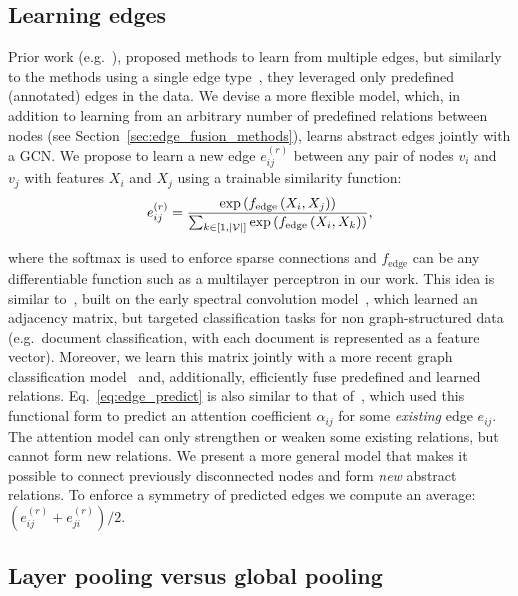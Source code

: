 \documentclass[final,nonatbib]{article} \usepackage{nips_2018}
\begin{document}
	\subsection{Learning edges}
	\label{sec:learn_edges}
	Prior work (e.g.~\cite{schlichtkrull2018modeling,bordes2013translating}),
	proposed methods to learn from multiple edges, but similarly to the methods using a single edge type~\cite{kipf2016semi}, they leveraged only predefined (annotated) edges in the data.
	We devise a more flexible model, which, in addition to learning from an arbitrary number of predefined relations between nodes (see Section~\ref{sec:edge_fusion_methods}), learns abstract edges jointly with a GCN.
	We propose to learn a new edge $e^{(r)}_{ij}$ between any pair of nodes $v_i$ and $v_j$ with features $X_i$ and $X_j$ using a trainable similarity function:
	\begin{equation}
	\label{eq:edge_predict}
	e^{(r)}_{ij}=\frac{\exp\left(f_{\text{edge}}\left(X_i, X_j\right)\right)}{\sum_{k \in [1,|\cal V|]} \exp\left(f_{\text{edge}}\left(X_i, X_k\right)\right)},
	\end{equation}

	where the softmax is used to enforce sparse connections and $f_{\text{edge}}$ can be any differentiable function such as a multilayer perceptron in our work.
	This idea is similar to~\cite{henaff2015deep}, built on the early spectral convolution model~\cite{bruna2013spectral}, which learned an adjacency matrix, but targeted classification tasks for non graph-structured data (e.g.~document classification, with each document is represented as a feature vector). Moreover, we learn this matrix jointly with a more recent graph classification model~\cite{defferrard2016convolutional} and, additionally, efficiently fuse predefined and learned relations. Eq.~\ref{eq:edge_predict} is also similar to that of~\cite{velickovic2017graph}, which used this functional form to predict an attention coefficient $\alpha_{ij}$ for some \textit{existing} edge $e_{ij}$. The attention model can only strengthen or weaken some existing relations, but cannot form new relations. We present a more general model that makes it possible to connect previously disconnected nodes and form \textit{new} abstract relations.
	To enforce a symmetry of predicted edges we compute an average: $(e^{(r)}_{ij} + e^{(r)}_{ji}) / 2$.

	\subsection{Layer pooling versus global pooling}
\end{document}
